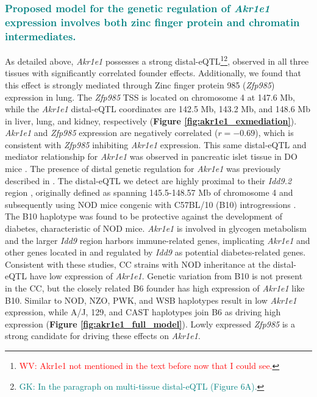 \documentclass[9pt,twocolumn,twoside]{gsajnl}
\newcommand{\WV}[2]{\textcolor{red}{#1\footnote{\textcolor{red}{WV: #2}}}}
\newcommand{\GK}[2]{\textcolor{teal}{#1\footnote{\textcolor{teal}{GK: #2}}}}
\newcommand{\GKinline}[1]{\textcolor{teal}{#1}}
\begin{document}
\subsubsection{\GKinline{Proposed model for the genetic regulation of \textit{Akr1e1} expression involves both zinc finger protein and chromatin intermediates.}}
As detailed above, \textit{Akr1e1} possesses a strong distal-eQTL\WV{}{Akr1e1 not mentioned in the text before now that I could see.}\GK{}{In the paragraph on multi-tissue distal-eQTL (Figure 6A).}, observed in all three tissues with significantly correlated founder effects. Additionally, we found that this effect is strongly mediated through Zinc finger protein 985 (\textit{Zfp985}) expression in lung. The \textit{Zfp985} TSS is located on chromosome 4 at 147.6 Mb, while the \textit{Akr1e1} distal-eQTL coordinates are 142.5 Mb, 143.2 Mb, and 148.6 Mb in liver, lung, and kidney, respectively (\textbf{Figure \ref{fig:akr1e1_exmediation}}). \textit{Akr1e1} and \textit{Zfp985} expression are negatively correlated ($r = -0.69$), which is consistent with \textit{Zfp985} inhibiting \textit{Akr1e1} expression. This same distal-eQTL and mediator relationship for \textit{Akr1e1} was observed in pancreatic islet tissue in DO mice \citep{Keller2018}.
The presence of distal genetic regulation for \textit{Akr1e1} was previously described in \cite{HamiltonWilliams2013}. The distal-eQTL we detect are highly proximal to their \textit{Idd9.2} region \citep{HamiltonWilliams2010}, originally defined as spanning 145.5-148.57 Mb of chromosome 4 and subsequently using NOD mice congenic with C57BL/10 (B10) introgressions \cite{HamiltonWilliams2013}. The B10 haplotype was found to be protective against the development of diabetes, characteristic of NOD mice. \textit{Akr1e1} is involved in glycogen metabolism and the larger \textit{Idd9} region harbors immune-related genes, implicating \textit{Akr1e1} and other genes located in and regulated by \textit{Idd9} as potential diabetes-related genes. 
Consistent with these studies, CC strains with NOD inheritance at the distal-eQTL have low expression of \textit{Akr1e1}. Genetic variation from B10 is not present in the CC, but the closely related B6 founder has high expression of \textit{Akr1e1} like B10. Similar to NOD, NZO, PWK, and WSB haplotypes result in low \textit{Akr1e1} expression, while A/J, 129, and CAST haplotypes join B6 as driving high expression (\textbf{Figure \ref{fig:akr1e1_full_model}}). Lowly expressed \textit{Zfp985} is a strong candidate for driving these effects on \textit{Akr1e1}.
\end{document}
